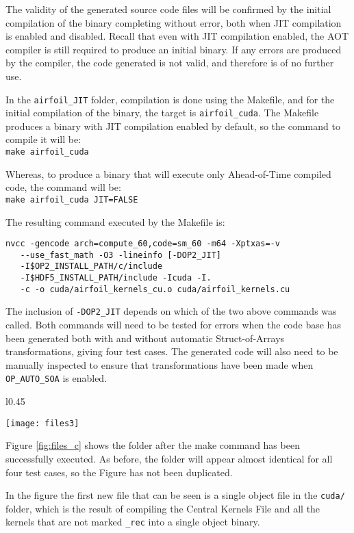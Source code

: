 The validity of the generated source code files will be confirmed by the initial compilation of the binary completing without error, both when JIT compilation is enabled and disabled. Recall that even with JIT compilation enabled, the AOT compiler is still required to produce an initial binary. If any errors are produced by the compiler, the code generated is not valid, and therefore is of no further use.
\par
In the \verb|airfoil_JIT| folder, compilation is done using the Makefile, and for the initial compilation of the binary, the target is \verb|airfoil_cuda|. The Makefile produces a binary with JIT compilation enabled by default, so the command to compile it will be: \\\verb|make airfoil_cuda|
\par Whereas, to produce a binary that will execute only Ahead-of-Time compiled code, the command will be: \\\verb|make airfoil_cuda JIT=FALSE|
\par \noindent The resulting command executed by the Makefile is: \vspace{-1em}
\begin{verbatim}
nvcc -gencode arch=compute_60,code=sm_60 -m64 -Xptxas=-v
   --use_fast_math -O3 -lineinfo [-DOP2_JIT]
   -I$OP2_INSTALL_PATH/c/include
   -I$HDF5_INSTALL_PATH/include -Icuda -I.
   -c -o cuda/airfoil_kernels_cu.o cuda/airfoil_kernels.cu
\end{verbatim}
The inclusion of \verb|-DOP2_JIT| depends on which of the two above commands was called. Both commands will need to be tested for errors when the code base has been generated both with and without automatic Struct-of-Arrays transformations, giving four test cases. The generated code will also need to be manually inspected to ensure that transformations have been made when \verb|OP_AUTO_SOA| is enabled.
\begin{wrapfigure}[18]{l}{0.45\textwidth}
\caption{\textit{airfoil} folder after Ahead-of-Time compilation}
\label{fig:files_c}
\texttt{[image: files3]}
\end{wrapfigure}
\par
\noindent Figure \ref{fig:files_c} shows the folder after the make command has been successfully executed. As before, the folder will appear almost identical for all four test cases, so the Figure has not been duplicated.\par
In the figure the first new file that can be seen is a single object file in the \verb|cuda/| folder, which is the result of compiling the Central Kernels File and all the kernels that are not marked \verb|_rec| into a single object binary.
